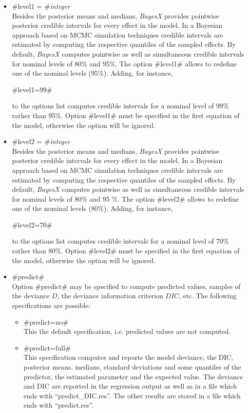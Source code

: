   
\begin{itemize}
\item \label{level1} #level1 = #{\em integer} \\
Besides the posterior means and medians, {\em BayesX} provides
pointwise posterior credible intervals for every effect in the
model. In a Bayesian approach based on MCMC simulation techniques
credible intervals are estimated by computing the respective
quantiles of the sampled effects. By default, {\em BayesX}
computes pointwise as well as simultaneous credible intervals for nominal levels of 80\%
and 95\%. The option #level1# allows to redefine one of the
nominal levels (95\%). Adding, for instance,

#level1=99#

to the options list computes credible intervals for a nominal
level of 99\% rather than 95\%.
Option #level1# must be specified in the first equation of the model, otherwise the option will be ignored.
\item \label{level2} #level2 = #{\em integer} \\
Besides the posterior means and medians, {\em BayesX} provides
pointwise posterior credible intervals for every effect in the
model. In a Bayesian approach based on MCMC simulation techniques
credible intervals are estimated by computing the respective
quantiles of the sampled effects. By default, {\em BayesX}
computes pointwise as well as simultaneous credible intervals for nominal levels of 80\%
and 95 \%. The option #level2# allows to redefine one of the
nominal levels (80\%). Adding, for instance,

#level2=70#

to the options list computes credible intervals for a nominal
level of 70\% rather than 80\%.
Option #level2# must be specified in the first equation of the model, otherwise the option will be ignored.
\item \label{MCMCpredict} #predict# \\
 
Option #predict# may be specified to compute predicted values, samples of the deviance
$D$, the deviance
information criterion $DIC$, etc. The following specifications are possible:
\begin{itemize}
\item #predict=no# \\
This the default specification, i.e. predicted values are not computed.
\item #predict=full# \\
This specification computes and reports the model
deviance, the DIC, posterior means, medians, standard deviations and some quantiles of the
predictor, the estimated parameter and the expected value. The deviance and DIC
are reported in the regression output as well as in a file which ends with
``predict\_DIC.res''. The other results are stored in a file which ends with ``predict.res''.


\end{itemize}
\end{itemize}

